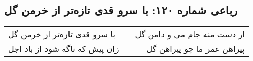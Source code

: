 \begin{center}
\section*{رباعی شماره ۱۲۰: با سرو قدی تازه‌تر از خرمن گل}
\label{sec:sh120}
\begin{longtable}{l p{0.5cm} r}
با سرو قدی تازه‌تر از خرمن گل
&&
از دست منه جام می و دامن گل
\\
زان پیش که ناگه شود از باد اجل
&&
پیراهن عمر ما چو پیراهن گل
\\
\end{longtable}
\end{center}
